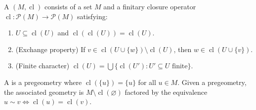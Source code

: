A  $(M, \operatorname{cl})$ consists of a set $M$ and a finitary closure operator $\operatorname{cl} : \mathcal{P}(M) \to \mathcal{P}(M)$ satisfying:
\begin{enumerate}
\item[(i)] $U \subseteq \operatorname{cl}(U)$ and $\operatorname{cl}(\operatorname{cl}(U)) = \operatorname{cl}(U)$.
\item[(ii)] (Exchange property) If $v \in \operatorname{cl}(U \cup \{w\}) \setminus \operatorname{cl}(U)$, then $w \in \operatorname{cl}(U \cup \{v\})$.
\item[(iii)] (Finite character) $\operatorname{cl}(U) = \bigcup \{\operatorname{cl}(U') : U' \subseteq U \text{ finite}\}$.
\end{enumerate}
A  is a pregeometry where $\operatorname{cl}(\{u\}) = \{u\}$ for all $u \in M$. Given a pregeometry, the associated geometry is $M \setminus \operatorname{cl}(\varnothing)$ factored by the equivalence $u \sim v \Leftrightarrow \operatorname{cl}(u) = \operatorname{cl}(v)$.
